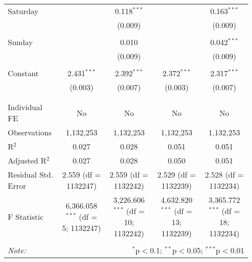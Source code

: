 \documentclass[
]{article}
\begin{document}
\begin{table}[!htbp]
{\begin{tabular}{@{\extracolsep{5pt}}lcccc}
 Saturday &  & 0.118$^{***}$ &  & 0.163$^{***}$ \\ 
  &  & (0.009) &  & (0.009) \\ 
  & & & & \\ 
 Sunday &  & 0.010 &  & 0.042$^{***}$ \\ 
  &  & (0.009) &  & (0.009) \\ 
  & & & & \\ 
 Constant & 2.431$^{***}$ & 2.392$^{***}$ & 2.372$^{***}$ & 2.317$^{***}$ \\ 
  & (0.003) & (0.007) & (0.003) & (0.007) \\ 
  & & & & \\ 
\hline \\[-1.8ex] 
Individual FE & No & No & No & No \\ 
Observations & 1,132,253 & 1,132,253 & 1,132,253 & 1,132,253 \\ 
R$^{2}$ & 0.027 & 0.028 & 0.051 & 0.051 \\ 
Adjusted R$^{2}$ & 0.027 & 0.028 & 0.050 & 0.051 \\ 
Residual Std. Error & 2.559 (df = 1132247) & 2.559 (df = 1132242) & 2.529 (df = 1132239) & 2.528 (df = 1132234) \\ 
F Statistic & 6,366.058$^{***}$ (df = 5; 1132247) & 3,226.606$^{***}$ (df = 10; 1132242) & 4,632.820$^{***}$ (df = 13; 1132239) & 3,365.772$^{***}$ (df = 18; 1132234) \\ 
\hline 
\hline \\[-1.8ex] 
\textit{Note:}  & \multicolumn{4}{r}{$^{*}$p$<$0.1; $^{**}$p$<$0.05; $^{***}$p$<$0.01} \\ 
\end{tabular}
} 
\end{table} 
\newpage
\end{document}
